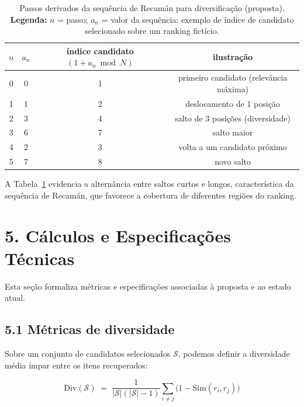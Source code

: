 \documentclass[
	article,
	11pt,
	oneside,
	a4paper,
	english,
	brazil,
	sumario=tradicional
	]{abntex2}
\begin{document}
\begin{table}[!htb]
\centering
\caption{Passos derivados da sequência de Recamán para diversificação (proposta).
\textbf{Legenda:} $n$ = passo; $a_n$ = valor da sequência; exemplo de índice de
candidato selecionado sobre um ranking fictício.}
\label{tab:offsets}
\begin{tabular}{cccc}
\toprule
$n$ & $a_n$ & índice candidato $(1\!+\!a_n \bmod N)$ & ilustração \\
\midrule
0 & 0 & 1 & primeiro candidato (relevância máxima) \\
1 & 1 & 2 & deslocamento de 1 posição \\
2 & 3 & 4 & salto de 3 posições (diversidade) \\
3 & 6 & 7 & salto maior \\
4 & 2 & 3 & volta a um candidato próximo \\
5 & 7 & 8 & novo salto \\
\bottomrule
\end{tabular}
\end{table}

A Tabela~\ref{tab:offsets} evidencia a alternância entre saltos curtos e longos,
característica da sequência de Recamán, que favorece a cobertura de diferentes
regiões do ranking.

\section*{5. Cálculos e Especificações Técnicas}

Esta seção formaliza métricas e especificações associadas à proposta e ao estado
atual.

\subsection*{5.1 Métricas de diversidade}

Sobre um conjunto de candidatos selecionados $\mathcal{S}$, podemos definir a
diversidade média ímpar entre os itens recuperados:

\begin{equation}
\label{eq:diversity}
\text{Div}(\mathcal{S})\;=\;\frac{1}{|\mathcal{S}|(|\mathcal{S}|-1)}
\sum_{i \neq j}\bigl(1 - \text{Sim}(r_i, r_j)\bigr)
\end{equation}
\end{document}
